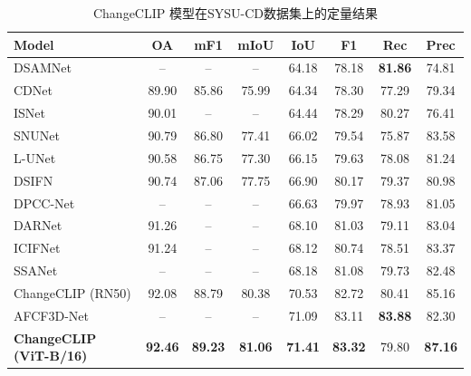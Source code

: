 \begin{table}[!htb]
  \centering
  \caption{ChangeCLIP 模型在SYSU-CD数据集上的定量结果}
  \label{tab:changeclip_sysu}
  \begin{tabular*}{\textwidth}{@{\extracolsep{\fill}} l c c c c c c c}
    \toprule
    Model & OA & mF1 & mIoU & IoU & F1 & Rec & Prec \\
    \midrule
    DSAMNet~\cite{shi_deeply_2022}                   & --    & --    & --    & 64.18 & 78.18 & \textbf{81.86} & 74.81 \\
    CDNet~\cite{Alcantarilla2016StreetviewCD}                     & 89.90 & 85.86 & 75.99 & 64.34 & 78.30 & 77.29 & 79.34 \\
    ISNet~\cite{Cheng2022ISNetTI}                     & 90.01 & --    & --    & 64.44 & 78.29 & 80.27 & 76.41 \\
    SNUNet~\cite{Fang2021SNUNetCDAD}                    & 90.79 & 86.80 & 77.41 & 66.02 & 79.54 & 75.87 & 83.58 \\
    L-UNet~\cite{Papadomanolaki2021ADM}                    & 90.58 & 86.75 & 77.30 & 66.15 & 79.63 & 78.08 & 81.24 \\
    DSIFN~\cite{Zhang2020ADS}                       & 90.74 & 87.06 & 77.75 & 66.90 & 80.17 & 79.37 & 80.98 \\
    DPCC-Net~\cite{Papadomanolaki2021ADM}                  & --    & --    & --    & 66.63 & 79.97 & 78.93 & 81.05 \\
    DARNet~\cite{li_densely_2022}                    & 91.26 & --    & --    & 68.10 & 81.03 & 79.11 & 83.04 \\
    ICIFNet~\cite{Feng2022ICIFNetIC}                   & 91.24 & --    & --    & 68.12 & 80.74 & 78.51 & 83.37 \\
    SSANet~\cite{Jiang2022JointVL}                    & --    & --    & --    & 68.18 & 81.08 & 79.73 & 82.48 \\
    ChangeCLIP (RN50)         & 92.08 & 88.79 & 80.38 & 70.53 & 82.72 & 80.41 & 85.16 \\
    AFCF3D-Net~\cite{Ye2023AdjacentLevelFC}                & --    & --    & --    & 71.09 & 83.11 & \textbf{83.88} & 82.30 \\
    \textbf{ChangeCLIP (ViT-B/16)} & \textbf{92.46} & \textbf{89.23} & \textbf{81.06} & \textbf{71.41} & \textbf{83.32} & 79.80 & \textbf{87.16} \\
    \bottomrule
  \end{tabular*}
\end{table}

